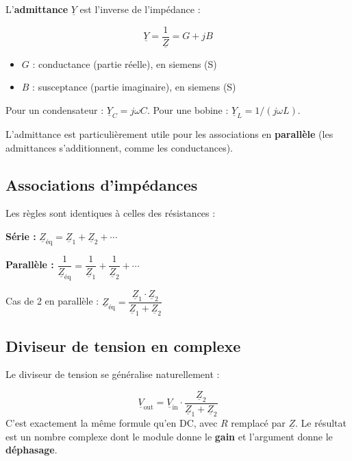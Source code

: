 \documentclass[12pt,a4paper,twoside]{book}
\begin{document}
L'\textbf{admittance} $\underline{Y}$ est l'inverse de l'impédance :

\begin{formule}
\[
\boxed{\underline{Y} = \frac{1}{\underline{Z}} = G + jB}
\]
\begin{itemize}[nosep]
\item $G$ : conductance (partie réelle), en siemens (S)
\item $B$ : susceptance (partie imaginaire), en siemens (S)
\end{itemize}
Pour un condensateur : $\underline{Y}_C = j\omega C$. Pour une bobine : $\underline{Y}_L = 1/(j\omega L)$.
\end{formule}

L'admittance est particulièrement utile pour les associations en \textbf{parallèle} (les admittances s'additionnent, comme les conductances).

\subsection{Associations d'impédances}

Les règles sont identiques à celles des résistances :

\begin{formule}
\textbf{Série :} $\boxed{\underline{Z}_{\text{éq}} = \underline{Z}_1 + \underline{Z}_2 + \cdots}$

\textbf{Parallèle :} $\boxed{\dfrac{1}{\underline{Z}_{\text{éq}}} = \dfrac{1}{\underline{Z}_1} + \dfrac{1}{\underline{Z}_2} + \cdots}$

Cas de 2 en parallèle : $\underline{Z}_{\text{éq}} = \dfrac{\underline{Z}_1 \cdot \underline{Z}_2}{\underline{Z}_1 + \underline{Z}_2}$
\end{formule}

\subsection{Diviseur de tension en complexe}

Le diviseur de tension se généralise naturellement :
\begin{formule}
\[
\boxed{\underline{V}_{\text{out}} = \underline{V}_{\text{in}} \cdot \frac{\underline{Z}_2}{\underline{Z}_1 + \underline{Z}_2}}
\]
C'est exactement la même formule qu'en DC, avec $R$ remplacé par $\underline{Z}$. Le résultat est un nombre complexe dont le module donne le \textbf{gain} et l'argument donne le \textbf{déphasage}.
\end{formule}
\end{document}
